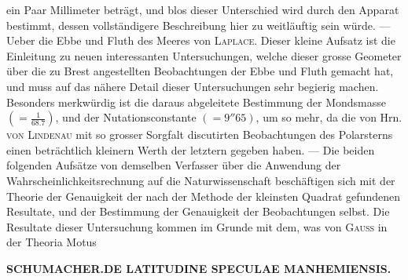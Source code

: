 ein Paar Millimeter beträgt, und blos dieser Unterschied wird durch den Apparat bestimmt, dessen vollständigere Beschreibung hier zu weitläuftig sein würde. --- Ueber die Ebbe und Fluth des Meeres von \textsc{Laplace}. Dieser kleine Aufsatz ist die Einleitung zu neuen interessanten Untersuchungen, welche dieser grosse Geometer über die zu Brest angestellten Beobachtungen der Ebbe und Fluth gemacht hat, und muss auf das nähere Detail dieser Untersuchungen sehr begierig machen. Besonders merkwürdig ist die daraus abgeleitete Bestimmung der Mondsmasse $(= \frac{1}{68.7})$, und der Nutationsconstante $(= 9''65)$, um so mehr, da die von Hrn. \textsc{von Lindenau} mit so grosser Sorgfalt discutirten Beobachtungen des Polarsterns einen beträchtlich kleinern Werth der letztern gegeben haben. --- Die beiden folgenden Aufsätze von demselben Verfasser über die Anwendung der Wahrscheinlichkeitsrechnung auf die Naturwissenschaft beschäftigen sich mit der Theorie der Genauigkeit der nach der Methode der kleinsten Quadrat gefundenen Resultate, und der Bestimmung der Genauigkeit der Beobachtungen selbst. Die Resultate dieser Untersuchung kommen im Grunde mit dem, was von \textsc{Gauss} in der Theoria Motus\par
\clearpage
\thispagestyle{empty}
\noindent{}%
\makebox[12mm][l]{}%
\parbox[t]{\dimexpr\linewidth-24mm\relax}{\centering\footnotesize\bfseries SCHUMACHER.\enspace DE LATITUDINE SPECULAE MANHEMIENSIS.\par}%
\par\medskip
